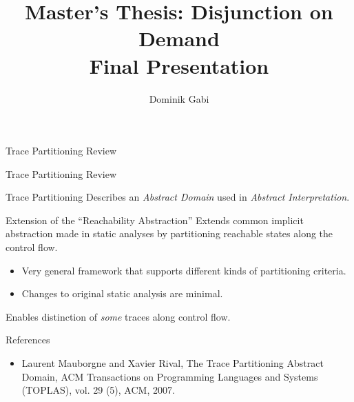 \documentclass{beamer}
\title{Master's Thesis: Disjunction on Demand\\
	Final Presentation}
\author{Dominik Gabi}
\begin{document}
\maketitle


\begin{section}{Trace Partitioning Review}


	\begin{frame}[t]{Trace Partitioning Review}
		\begin{block}{Trace Partitioning}
			Describes an \emph{Abstract Domain} used in \emph{Abstract Interpretation}.
		\end{block}
		
		\begin{block}{Extension of the ``Reachability Abstraction''}
			Extends common implicit abstraction made in static analyses by partitioning reachable states along the control flow.
			\begin{itemize}
				\item Very general framework that supports different kinds of partitioning criteria.
				\item Changes to original static analysis are minimal.
			\end{itemize}
			Enables distinction of \emph{some} traces along control flow.
		\end{block}

		\begin{block}{References}
			\begin{itemize}
				\item Laurent Mauborgne and Xavier Rival, The Trace Partitioning Abstract Domain, ACM Transactions on Programming Languages and Systems (TOPLAS), vol. 29 (5), ACM, 2007.
			\end{itemize}
		\end{block}
	\end{frame}
	 


\end{section}
\end{document}
